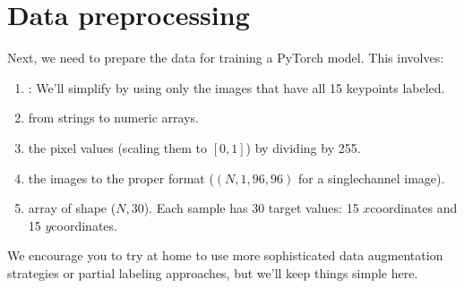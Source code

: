 \documentclass[letterpaper,10pt,english]{jupyterBook}
\begin{document}
\section{Data preprocessing}
\label{\detokenize{04:data-preprocessing}}
\sphinxAtStartPar
Next, we need to prepare the data for training a PyTorch model. This involves:
\begin{enumerate}
%
\item {} 
\sphinxAtStartPar
{}: We’ll simplify by using only the images that have all 15 keypoints labeled.

\item {} 
\sphinxAtStartPar
{} from strings to numeric arrays.

\item {} 
\sphinxAtStartPar
{} the pixel values (scaling them to \([0,1]\)) by dividing by 255.

\item {} 
\sphinxAtStartPar
{} the images to the proper format (\( (N, 1, 96, 96) \) for a single\sphinxhyphen{}channel image).

\item {} 
\sphinxAtStartPar
{} array of shape (\( N, 30 \)). Each sample has 30 target values: 15 \( x \)\sphinxhyphen{}coordinates and 15 \( y \)\sphinxhyphen{}coordinates.

\end{enumerate}

\sphinxAtStartPar
We encourage you to try at home to use more sophisticated data augmentation strategies or partial labeling approaches, but we’ll keep things simple here.
\end{document}
